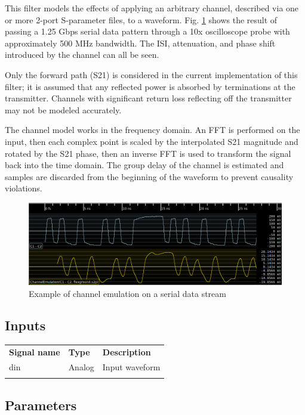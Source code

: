 This filter models the effects of applying an arbitrary channel, described via one or more 2-port S-parameter files, to
a waveform. Fig. \ref{filter_channelemu} shows the result of passing a 1.25 Gbps serial data pattern through a 10x
oscilloscope probe with approximately 500 MHz bandwidth. The ISI, attenuation, and phase shift introduced by the
channel can all be seen.

Only the forward path (S21) is considered in the current implementation of this filter; it is assumed that any
reflected power is absorbed by terminations at the transmitter. Channels with significant return loss reflecting off
the transmitter may not be modeled accurately.

The channel model works in the frequency domain. An FFT is performed on the input, then each complex point is
scaled by the interpolated S21 magnitude and rotated by the S21 phase, then an inverse FFT is used to transform the
signal back into the time domain. The group delay of the channel is estimated and samples are discarded from the
beginning of the waveform to prevent causality violations.

\begin{figure}[h]
\centering
\includegraphics[width=16cm]{images/filters/channel-emulation.png}
\caption{Example of channel emulation on a serial data stream}
\label{filter_channelemu}
\end{figure}

\subsection{Inputs}

\begin{tabularx}{16cm}{llX}
\thickhline
\textbf{Signal name} & \textbf{Type} & \textbf{Description} \\
\thickhline
din & Analog & Input waveform \\
\thickhline
\end{tabularx}

\subsection{Parameters}

